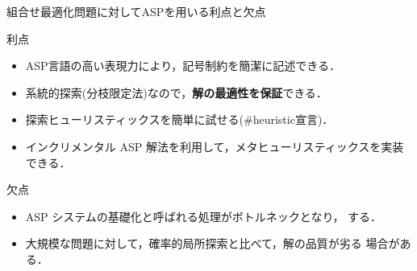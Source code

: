 \documentclass[11pt,dvipdfmx]{beamer}
\begin{document}
\begin{frame}{組合せ最適化問題に対してASPを用いる利点と欠点}
  \begin{alertblock}{利点}
    \begin{itemize}
    \item ASP言語の高い表現力により，記号制約を簡潔に記述できる．
    \item 系統的探索(分枝限定法)なので，\alert{\bf 解の最適性を保証}できる．
    \item 探索ヒューリスティックスを簡単に試せる(\textsf{\#heuristic宣言})．
    \item インクリメンタル ASP 解法を利用して，メタヒューリスティックスを実装できる．
    \end{itemize}
  \end{alertblock}
  \bigskip
  \begin{block}{欠点}
    \begin{itemize}
    \item ASP システムの基礎化\footnotemark[1]
      と呼ばれる処理がボトルネックとなり，
      する．
    \item 大規模な問題に対して，確率的局所探索と比べて，解の品質が劣る
      場合がある．
    \end{itemize}
  \end{block}
\end{frame}
\end{document}
